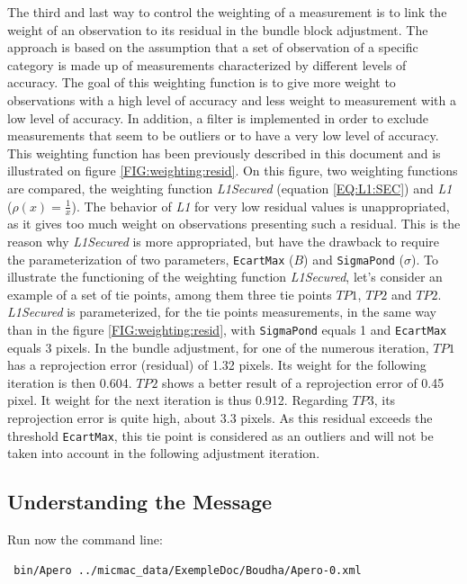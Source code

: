 The third and last way to control the weighting of a measurement is to link the weight of an observation to its residual in the bundle block adjustment.
The approach is based on the assumption that a set of observation of a specific category is made up of measurements characterized by different levels of accuracy. The goal of this weighting function is to give more weight to observations with a high level of accuracy and less weight to measurement with a low level of accuracy.
In addition, a filter is implemented in order to exclude measurements that seem to be outliers or to have a very low level of accuracy.
This weighting function has been previously described in this document and is illustrated on figure \ref{FIG:weighting:resid}.
On this figure, two weighting functions are compared, the weighting function {\it L1Secured} (equation \ref{EQ:L1:SEC}) and {\it L1} ($\rho(x)=\frac1x$).
The behavior of {\it L1} for very low residual values is unappropriated, as it gives too much weight on observations presenting such a residual.
This is the reason why {\it L1Secured} is more appropriated, but have the drawback to require the parameterization of two parameters, {\tt EcartMax}  ($B$) and {\tt SigmaPond}  ($\sigma$).
To illustrate the functioning of the weighting function {\it L1Secured}, let's consider an example of a set of tie points, among them three tie points $TP1$, $TP2$ and $TP2$.
{\it L1Secured} is parameterized, for the tie points measurements, in the same way than in the figure \ref{FIG:weighting:resid}, with {\tt SigmaPond} equals 1 and {\tt EcartMax} equals 3 pixels.
In the bundle adjustment, for one of the numerous iteration, $TP1$ has a reprojection error (residual) of 1.32 pixels.
Its weight for the following iteration is then 0.604.
$TP2$ shows a better result of a reprojection error of 0.45 pixel.
It weight for the next iteration is thus 0.912.
Regarding $TP3$, its reprojection error is quite high, about 3.3 pixels.
As this residual exceeds the threshold {\tt EcartMax}, this tie point is considered as an outliers and will not be taken into account in the following adjustment iteration.



\subsection{Understanding the Message}

Run now the command line:

{\scriptsize
\begin{verbatim}
 bin/Apero ../micmac_data/ExempleDoc/Boudha/Apero-0.xml
\end{verbatim}
}

